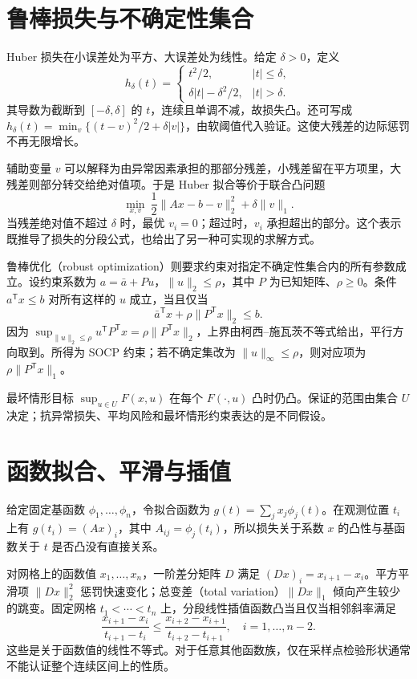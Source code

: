 \documentclass[UTF8,12pt,a4paper,fontset=fandol]{ctexbook}
\begin{document}
\section{鲁棒损失与不确定性集合}

Huber 损失在小误差处为平方、大误差处为线性。给定 $\delta>0$，定义
\[
 h_\delta(t)=
 \begin{cases}t^2/2,&|t|\leq\delta,\\
 \delta|t|-\delta^2/2,&|t|>\delta.
 \end{cases}
\]
其导数为截断到 $[-\delta,\delta]$ 的 $t$，连续且单调不减，故损失凸。还可写成 $h_\delta(t)=\min_v\{(t-v)^2/2+\delta|v|\}$，由软阈值代入验证。这使大残差的边际惩罚不再无限增长。

辅助变量 $v$ 可以解释为由异常因素承担的那部分残差，小残差留在平方项里，大残差则部分转交给绝对值项。于是 Huber 拟合等价于联合凸问题
\[
 \min_{x,v}\ \frac12\|Ax-b-v\|_2^2+\delta\|v\|_1.
\]
当残差绝对值不超过 $\delta$ 时，最优 $v_i=0$；超过时，$v_i$ 承担超出的部分。这个表示既推导了损失的分段公式，也给出了另一种可实现的求解方式。

鲁棒优化（robust optimization）则要求约束对指定不确定性集合内的所有参数成立。设约束系数为 $a=\bar a+Pu$，$\|u\|_2\leq\rho$，其中 $P$ 为已知矩阵、$\rho\geq0$。条件 $a^{\mathsf T}x\leq b$ 对所有这样的 $u$ 成立，当且仅当
\[
 \bar a^{\mathsf T}x+\rho\|P^{\mathsf T}x\|_2\leq b.
\]
因为 $\sup_{\|u\|_2\leq\rho}u^{\mathsf T}P^{\mathsf T}x=\rho\|P^{\mathsf T}x\|_2$，上界由柯西--施瓦茨不等式给出，平行方向取到。所得为 SOCP 约束；若不确定集改为 $\|u\|_\infty\leq\rho$，则对应项为 $\rho\|P^{\mathsf T}x\|_1$。

最坏情形目标 $\sup_{u\in U}F(x,u)$ 在每个 $F(\cdot,u)$ 凸时仍凸。保证的范围由集合 $U$ 决定；抗异常损失、平均风险和最坏情形约束表达的是不同假设。

\section{函数拟合、平滑与插值}

给定固定基函数 $\phi_1,\ldots,\phi_n$，令拟合函数为 $g(t)=\sum_jx_j\phi_j(t)$。在观测位置 $t_i$ 上有 $g(t_i)=(Ax)_i$，其中 $A_{ij}=\phi_j(t_i)$，所以损失关于系数 $x$ 的凸性与基函数关于 $t$ 是否凸没有直接关系。

对网格上的函数值 $x_1,\ldots,x_n$，一阶差分矩阵 $D$ 满足 $(Dx)_i=x_{i+1}-x_i$。平方平滑项 $\|Dx\|_2^2$ 惩罚快速变化；总变差（total variation）$\|Dx\|_1$ 倾向产生较少的跳变。固定网格 $t_1<\cdots<t_n$ 上，分段线性插值函数凸当且仅当相邻斜率满足
\[
 \frac{x_{i+1}-x_i}{t_{i+1}-t_i}
 \leq\frac{x_{i+2}-x_{i+1}}{t_{i+2}-t_{i+1}},\quad i=1,\ldots,n-2.
\]
这些是关于函数值的线性不等式。对于任意其他函数族，仅在采样点检验形状通常不能认证整个连续区间上的性质。
\end{document}
